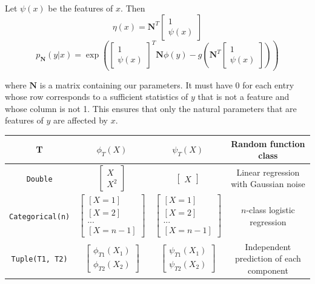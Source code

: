 \documentclass{article}
\begin{document}
    Let $\psi(x)$ be the features of $x$.  Then
  $$\eta(x) = \mathbf{N}^T \begin{bmatrix} 1 \\ \psi(x) \end{bmatrix}$$
    $$p_{\mathbf{N}}(y | x) = \exp\left(\begin{bmatrix} 1 \\ \psi(x) \end{bmatrix} ^T \mathbf{N} \phi(y) - g\left(\mathbf{N}^T \begin{bmatrix} 1 \\ \psi(x) \end{bmatrix}\right)\right)$$

    where $\mathbf{N}$ is a matrix containing our parameters.  It must have 0 for each entry whose row corresponds
    to a sufficient statistics of $y$ that is not a feature and whose column is not 1.
    This ensures that only the
    natural parameters that are features of $y$ are affected by $x$.

    \begin{tabular}{| c | c | c | c|}
      \hline
      T & $\phi_T(X)$ & $\psi_T(X)$ & Random function class \\

      \hline
    \texttt{Double} & $\begin{bmatrix} X \\ X^2 \end{bmatrix}$ & $\begin{bmatrix} X \end{bmatrix}$ & Linear regression with Gaussian noise \\

      \hline
    \texttt{Categorical(n)} & $\begin{bmatrix} [X = 1] \\ [X = 2] \\ ...\\ [X = n-1] \end{bmatrix}$ & $\begin{bmatrix} [X = 1] \\ [X = 2] \\ ...\\ [X = n-1] \end{bmatrix}$ & $n$-class logistic regression \\

      \hline
    \texttt{Tuple(T1, T2)} & $\begin{bmatrix} \phi_{T1}(X_1) \\ \phi_{T2}(X_2) \end{bmatrix}$
                           & $\begin{bmatrix} \psi_{T1}(X_1) \\ \psi_{T2}(X_2) \end{bmatrix}$ &
      Independent prediction of each component
      \\
      \hline
    \end{tabular}
\end{document}
